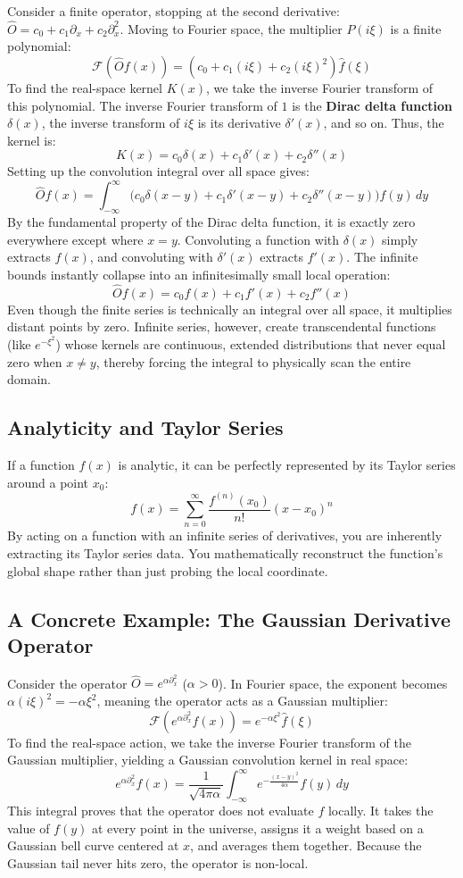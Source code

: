\documentclass[11pt, a4paper]{article}
\begin{document}
Consider a finite operator, stopping at the second derivative: $\hat{O} = c_0 + c_1 \partial_x + c_2 \partial_x^2$. Moving to Fourier space, the multiplier $P(i\xi)$ is a finite polynomial:
\[
\mathcal{F}(\hat{O} f(x)) = (c_0 + c_1(i\xi) + c_2(i\xi)^2) \hat{f}(\xi)
\]
To find the real-space kernel $K(x)$, we take the inverse Fourier transform of this polynomial. The inverse Fourier transform of $1$ is the \textbf{Dirac delta function} $\delta(x)$, the inverse transform of $i\xi$ is its derivative $\delta'(x)$, and so on. Thus, the kernel is:
\[
K(x) = c_0 \delta(x) + c_1 \delta'(x) + c_2 \delta''(x)
\]
Setting up the convolution integral over all space gives:
\[
\hat{O} f(x) = \int_{-\infty}^{\infty} \Big( c_0 \delta(x-y) + c_1 \delta'(x-y) + c_2 \delta''(x-y) \Big) f(y) \, dy
\]
By the fundamental property of the Dirac delta function, it is exactly zero everywhere except where $x=y$. Convoluting a function with $\delta(x)$ simply extracts $f(x)$, and convoluting with $\delta'(x)$ extracts $f'(x)$. The infinite bounds instantly collapse into an infinitesimally small local operation:
\[
\hat{O} f(x) = c_0 f(x) + c_1 f'(x) + c_2 f''(x)
\]
Even though the finite series is technically an integral over all space, it multiplies distant points by zero. Infinite series, however, create transcendental functions (like $e^{-\xi^2}$) whose kernels are continuous, extended distributions that never equal zero when $x \neq y$, thereby forcing the integral to physically scan the entire domain.

\subsection{Analyticity and Taylor Series}
If a function $f(x)$ is analytic, it can be perfectly represented by its Taylor series around a point $x_0$:
\[
f(x) = \sum_{n=0}^{\infty} \frac{f^{(n)}(x_0)}{n!} (x - x_0)^n
\]
By acting on a function with an infinite series of derivatives, you are inherently extracting its Taylor series data. You mathematically reconstruct the function's global shape rather than just probing the local coordinate.

\subsection{A Concrete Example: The Gaussian Derivative Operator}
Consider the operator $\hat{O} = e^{\alpha \partial_x^2}$ ($\alpha > 0$). In Fourier space, the exponent becomes $\alpha(i\xi)^2 = -\alpha \xi^2$, meaning the operator acts as a Gaussian multiplier:
\[
\mathcal{F}(e^{\alpha \partial_x^2} f(x)) = e^{-\alpha \xi^2} \hat{f}(\xi)
\]
To find the real-space action, we take the inverse Fourier transform of the Gaussian multiplier, yielding a Gaussian convolution kernel in real space:
\[
e^{\alpha \partial_x^2} f(x) = \frac{1}{\sqrt{4\pi \alpha}} \int_{-\infty}^{\infty} e^{-\frac{(x-y)^2}{4\alpha}} f(y) \, dy
\]
This integral proves that the operator does not evaluate $f$ locally. It takes the value of $f(y)$ at every point in the universe, assigns it a weight based on a Gaussian bell curve centered at $x$, and averages them together. Because the Gaussian tail never hits zero, the operator is non-local.
\end{document}
